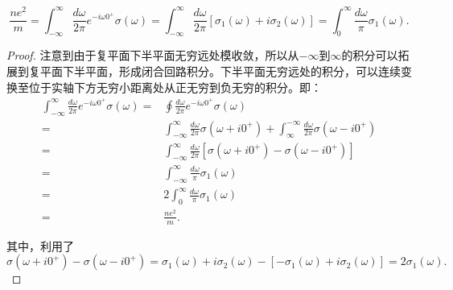 \documentclass[reqno,a4paper,12pt]{amsart}
\begin{document}
\[
	\frac{ne^2}{m} = \int_{-\infty}^\infty \frac{d\omega}{2\pi} e^{-i\omega 0^+} \sigma(\omega) = \int_{-\infty}^\infty \frac{d\omega}{2\pi} [\sigma_1(\omega) + i\sigma_2(\omega)] = \int_0^\infty \frac{d\omega}{\pi} \sigma_1(\omega). \tag{79}
\]

\begin{proof}
注意到由于复平面下半平面无穷远处模收敛，所以从$-\infty$到$\infty$的积分可以拓展到复平面下半平面，形成闭合回路积分。下半平面无穷远处的积分，可以连续变换至位于实轴下方无穷小距离处从正无穷到负无穷的积分。即：
\begin{align*}
	\int_{-\infty}^\infty \frac{d\omega}{2\pi} e^{-i\omega 0^+} \sigma(\omega) =& \oint \frac{d\omega}{2\pi} e^{-i\omega 0^+} \sigma(\omega) \\
	=& \int_{-\infty}^\infty \frac{d\omega}{2\pi} \sigma(\omega+i0^+) + \int_{\infty}^{-\infty}\frac{d\omega}{2\pi} \sigma(\omega-i0^+) \\
	=& \int_{-\infty}^\infty \frac{d\omega}{2\pi} [\sigma(\omega+i0^+) - \sigma(\omega-i0^+)] \\
	=& \int_{-\infty}^\infty \frac{d\omega}{\pi} \sigma_1(\omega) \\
	=& 2\int_0^\infty \frac{d\omega}{\pi} \sigma_1(\omega) \\
	=& \frac{ne^2}{m}.
\end{align*}

其中，利用了
\[
	\sigma(\omega+i0^+) - \sigma(\omega-i0^+) = \sigma_1(\omega) + i\sigma_2(\omega) - [-\sigma_1(\omega) + i\sigma_2(\omega)] = 2\sigma_1(\omega).
\]
\end{proof}
\end{document}
